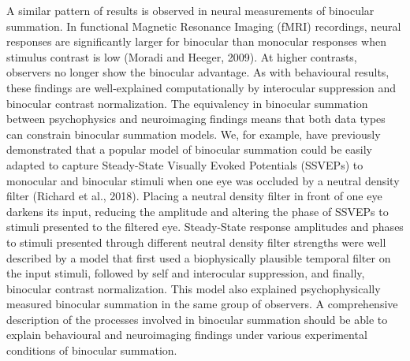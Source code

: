 \documentclass[review,
  12pt,
]{elsarticle}
\begin{document}
A similar pattern of results is observed in neural measurements of
binocular summation. In functional Magnetic Resonance Imaging (fMRI)
recordings, neural responses are significantly larger for binocular than
monocular responses when stimulus contrast is low (Moradi and Heeger,
2009). At higher contrasts, observers no longer show the binocular
advantage. As with behavioural results, these findings are
well-explained computationally by interocular suppression and binocular
contrast normalization. The equivalency in binocular summation between
psychophysics and neuroimaging findings means that both data types can
constrain binocular summation models. We, for example, have previously
demonstrated that a popular model of binocular summation could be easily
adapted to capture Steady-State Visually Evoked Potentials (SSVEPs) to
monocular and binocular stimuli when one eye was occluded by a neutral
density filter (Richard et al., 2018). Placing a neutral density filter
in front of one eye darkens its input, reducing the amplitude and
altering the phase of SSVEPs to stimuli presented to the filtered eye.
Steady-State response amplitudes and phases to stimuli presented through
different neutral density filter strengths were well described by a
model that first used a biophysically plausible temporal filter on the
input stimuli, followed by self and interocular suppression, and
finally, binocular contrast normalization. This model also explained
psychophysically measured binocular summation in the same group of
observers. A comprehensive description of the processes involved in
binocular summation should be able to explain behavioural and
neuroimaging findings under various experimental conditions of binocular
summation.
\end{document}

